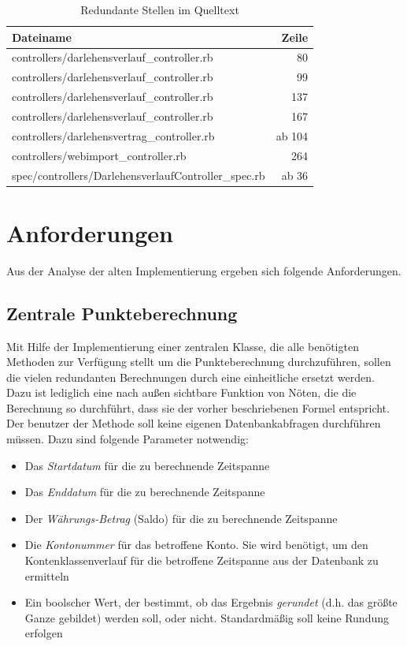 \documentclass[12pt]{scrreprt}
\begin{document}
\begin{table}
  \begin{center}
    \begin{tabular}{|l|r|}
      \hline
      \textbf{Dateiname} & \textbf{Zeile}\\
      \hline
      controllers/darlehensverlauf\_controller.rb & 80\\
      \hline
      controllers/darlehensverlauf\_controller.rb & 99\\
      \hline
      controllers/darlehensverlauf\_controller.rb & 137\\
      \hline
      controllers/darlehensverlauf\_controller.rb & 167\\
      \hline
      controllers/darlehensvertrag\_controller.rb & ab 104\\
      \hline
      controllers/webimport\_controller.rb & 264\\
      \hline
      spec/controllers/DarlehensverlaufController\_spec.rb & ab 36\\
      \hline
    \end{tabular}
    \caption{Redundante Stellen im Quelltext}
    \label{redundant}
  \end{center}
\end{table}
\vspace{2mm}

\section{Anforderungen}
Aus der Analyse der alten Implementierung ergeben sich folgende Anforderungen.

\subsection{Zentrale Punkteberechnung}
Mit Hilfe der Implementierung einer zentralen Klasse, die alle benötigten Methoden zur Verfügung stellt um die Punkteberechnung durchzuführen, sollen die vielen redundanten Berechnungen durch eine einheitliche ersetzt werden. Dazu ist lediglich eine nach außen sichtbare Funktion von Nöten, die die Berechnung so durchführt, dass sie der vorher beschriebenen Formel entspricht. Der benutzer der Methode soll keine eigenen Datenbankabfragen durchführen müssen. Dazu sind folgende Parameter notwendig:

\begin{itemize}
  \item Das \emph{Startdatum} für die zu berechnende Zeitspanne
  \item Das \emph{Enddatum} für die zu berechnende Zeitspanne
  \item Der \emph{Währungs-Betrag} (Saldo) für die zu berechnende Zeitspanne
  \item Die \emph{Kontonummer} für das betroffene Konto. Sie wird benötigt, um den Kontenklassenverlauf für die betroffene Zeitspanne aus der Datenbank zu ermitteln
  \item Ein boolscher Wert, der bestimmt, ob das Ergebnis \emph{gerundet} (d.h. das größte Ganze gebildet) werden soll, oder nicht. Standardmäßig soll keine Rundung erfolgen
\end{itemize}
\end{document}
